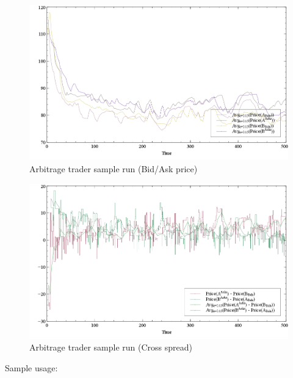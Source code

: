 \documentclass[a4paper,11pt]{article}
\begin{document}
\begin{figure}[htbp]
\centering
\includegraphics[width=1\linewidth]{Figures/Arbitrage_Bid_Ask_Spread.png}
\caption{Arbitrage trader sample run (Bid/Ask price)}
\label{fig:ArbBidAsk}
\end{figure}

\begin{figure}[htbp]
\centering
\includegraphics[width=1\linewidth]{Figures/Arbitrage_Cross_Spread.png}
\caption{Arbitrage trader sample run (Cross spread)}
\label{fig:ArbCross}
\end{figure}

Sample usage:
\end{document}

